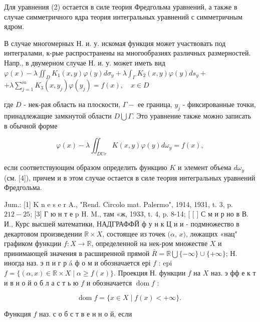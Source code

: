 \documentclass[10pt]{article}
\begin{document}
Для уравнения (2) остается в силе теория Фредгольма уравнений, а также в случае симметричного ядра теория интегральных уравнений с симметричным ядром.



В случае многомерных Н. и. у. искомая функция может участвовать под интегралами, к-рые распространены на многообразиях различных размерностей. Напр., в двумерном случае Н. и. у. может иметь вид $\varphi(x)-\lambda \iint_{D} K_{1}(x, y) \varphi(y) d \sigma_{y}+\lambda \int_{\Gamma} K_{2}(x, y) \varphi(y) d s_{y}+$ $+\lambda \sum_{j=1}^{m} K_{3}\left(x, y_{j}\right) \varphi\left(y_{j}\right)=f(x), \quad x \in D$



где $D$ - нек-рая область на плоскости, $\Gamma-$ ее граница, $y_{j}$ - фиксированные точки, принадлежащие замкнутой области $D \bigcup \Gamma$. Это уравнение также можно записать в обычной форме



\[

\varphi(x)-\lambda \iint_{D U r} K(x, y) \varphi(y) d \omega_{y}=f(x),

\]



если соответствующим образом определить функцию $K$ и элемент объема $d \omega_{y}$ (см. [4]), причем и в этом случае остается в силе теория интегральных уравнений Фредгольма.



Jum.: [1] K n e s e r A., "Rend. Circolo mat. Palermo", 1914, 1931, t. 3, p. $212-25$; [3] Г ю н т е p H. M., там «ж, 1933, t. 4, p. 8-14; [ [ ] С м и р но в В. И., Курс высшей математики, НАДГРАФФЙ ф у н к Ц и и - подмножество в декартовом произведении $\mathbb{R} \times X$, состоящее из точек $(\alpha$, $x)$, лөжащих «нац" графиком функции $f: X \rightarrow \mathbb{R}$, определенной на нек-ром множестве $X$ и принимающей значения в расширенной прямой $\bar{R}=\mathbb{R} \bigcup\{-\infty\} \cup\{+\infty\}$; Н. иногда наз. э п и г р á ф о м и обозначается ері $f$ : epi $f=\{(\alpha, x) \in \mathbb{R} \times X \mid \alpha \geqslant f(x)\}$. Проекция Н. функции $f$ на $X$ наз. э фф е к т и в н о й о б л а с т ь ю $f$ и обозначается $\operatorname{dom} f$ :



\[

\operatorname{dom} f=\{x \in X \mid f(x)<+\infty\} \text {. }

\]



Функция $f$ наз. с о б с т в е н н о й, если
\end{document}
